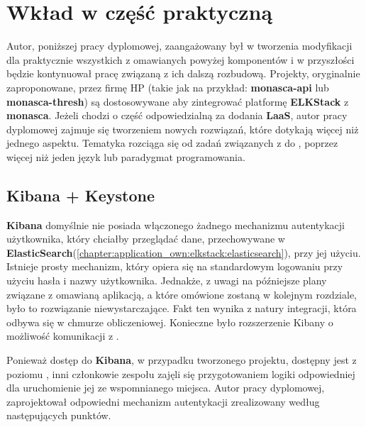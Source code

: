 \section{Wkład w część praktyczną}
\label{chapter:application_own:own_work}

Autor, poniższej pracy dyplomowej, zaangażowany był w tworzenia modyfikacji dla praktycznie wszystkich z omawianych powyżej komponentów i w przyszłości będzie kontynuował pracę związaną z ich dalszą rozbudową.
Projekty, oryginalnie zaproponowane, przez firmę HP (takie jak na przykład: \textbf{monasca-api} lub \textbf{monasca-thresh})
są dostosowywane aby zintegrować platformę \textbf{ELKStack} z \textbf{monasca}.
Jeżeli chodzi o część odpowiedzialną za dodania \textbf{LaaS}, autor pracy dyplomowej zajmuje się
tworzeniem nowych rozwiązań, które dotykają więcej niż jednego aspektu. Tematyka rozciąga się
od zadań związanych z  
do , poprzez więcej niż jeden język lub paradygmat programowania.

\subsection{Kibana + Keystone}
\label{chapter:application:own_work:kibana_and_keystone}

\textbf{Kibana} domyślnie nie posiada włączonego żadnego mechanizmu autentykacji użytkownika, który
chciałby przeglądać dane, przechowywane w \textbf{ElasticSearch}(\ref{chapter:application_own:elkstack:elasticsearch}), 
przy jej użyciu. Istnieje prosty mechanizm, który opiera się na standardowym logowaniu przy użyciu
hasła i nazwy użytkownika. Jednakże, z uwagi na późniejsze plany związane z omawianą aplikacją, a które 
omówione zostaną w kolejnym rozdziale, było to rozwiązanie niewystarczające. Fakt ten wynika z natury
integracji, która odbywa się w chmurze obliczeniowej. Konieczne było rozszerzenie Kibany o możliwość
komunikacji z .

Ponieważ dostęp do \textbf{Kibana}, w przypadku tworzonego projektu, dostępny jest z poziomu , inni
członkowie zespołu zajęli się przygotowaniem logiki odpowiedniej dla uruchomienie jej ze wspomnianego miejsca. Autor pracy 
dyplomowej, zaprojektował odpowiedni mechanizm autentykacji zrealizowany według następujących punktów.

